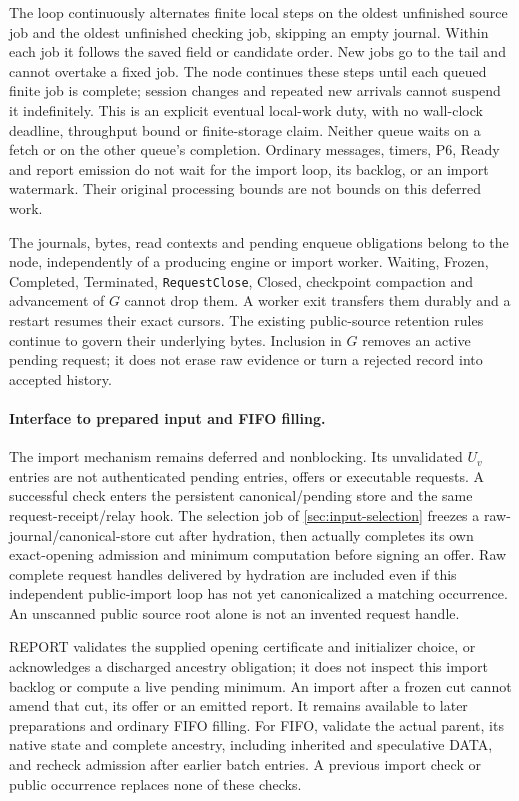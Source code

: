 The loop continuously alternates finite local steps on the oldest
unfinished source job and the oldest unfinished checking job, skipping
an empty journal. Within each job it follows the saved field or
candidate order. New jobs go to the tail and cannot overtake a fixed
job. The node continues these steps until each queued finite job is
complete; session changes and repeated new arrivals cannot suspend it
indefinitely. This is an explicit eventual local-work duty, with no
wall-clock deadline, throughput bound or finite-storage claim.
Neither queue waits on a fetch or on the other queue's completion.
Ordinary messages, timers, P6, Ready and report emission do not wait for
the import loop, its backlog, or an import watermark. Their original
processing bounds are not bounds on this deferred work.

The journals, bytes, read contexts and pending enqueue obligations belong
to the node, independently of a producing engine or import worker.
Waiting, Frozen, Completed, Terminated, \texttt{RequestClose}, Closed,
checkpoint compaction and advancement of $G$ cannot drop them. A worker
exit transfers them durably and a restart resumes their exact cursors.
The existing public-source retention rules continue to govern their
underlying bytes. Inclusion in $G$ removes an active pending request;
it does not erase raw evidence or turn a rejected record into accepted
history.

\paragraph{Interface to prepared input and FIFO filling.}
The import mechanism remains deferred and nonblocking. Its unvalidated
$U_v$ entries are not authenticated pending entries, offers or executable
requests. A successful check enters the persistent canonical/pending
store and the same request-receipt/relay hook. The selection job of
\cref{sec:input-selection} freezes a raw-journal/canonical-store cut after
hydration, then actually completes its own exact-opening admission and
minimum computation before signing an offer. Raw complete request
handles delivered by hydration are included even if this independent
public-import loop has not yet canonicalized a matching occurrence.
An unscanned public source root alone is not an invented request handle.

REPORT validates the supplied opening certificate and initializer choice,
or acknowledges a discharged ancestry obligation; it does not inspect
this import backlog or compute a live pending minimum. An import after
a frozen cut cannot amend that cut, its offer or an emitted report.
It remains available to later preparations and ordinary FIFO filling.
For FIFO, validate the actual parent, its native state and complete
ancestry, including inherited and speculative DATA, and recheck admission
after earlier batch entries. A previous import check or public occurrence
replaces none of these checks.

